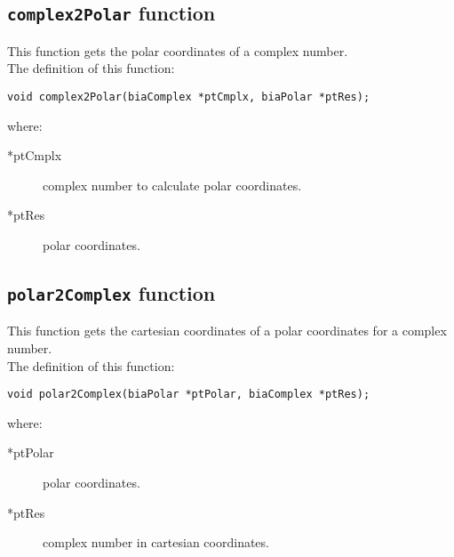 \subsection{\texttt{complex2Polar} function}

This function gets the polar coordinates of a complex number.\\

The definition of this function:
%
\begin{verbatim}
void complex2Polar(biaComplex *ptCmplx, biaPolar *ptRes);  
\end{verbatim}
%
where:
%
\begin{description}
\item[*ptCmplx] complex number to calculate polar coordinates.
\item[*ptRes] polar coordinates.
\end{description}

\subsection{\texttt{polar2Complex} function}

This function gets the cartesian coordinates of a polar coordinates for a complex number.\\

The definition of this function:
%
\begin{verbatim}
void polar2Complex(biaPolar *ptPolar, biaComplex *ptRes);  
\end{verbatim}
%
where:
%
\begin{description}
\item[*ptPolar] polar coordinates.
\item[*ptRes] complex number in cartesian coordinates.
\end{description}

